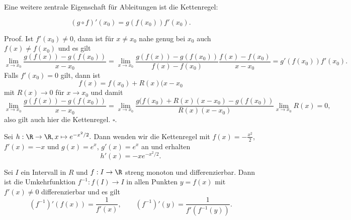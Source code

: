 \documentclass[letterpaper,10pt,english]{jupyterBook}
\begin{document}
Eine weitere zentrale Eigenschaft für Ableitungen ist die Kettenregel:
\label{differential/kombfkt:theorem-3}
\begin{theorem}{}{}


\begin{equation*}
 (g\circ f)'(x_0) = g(f(x_0)) f'(x_0).
\end{equation*}\end{theorem}

\begin{emphBox}{}{}
Proof. Ist \(f'(x_0) \neq 0\), dann ist für \(x\neq x_0\) nahe genug bei \(x_0\) auch \(f(x) \neq f(x_0)\) und es gilt
\begin{equation*}
\lim_{x \rightarrow x_0} \frac{g(f(x))-g(f(x_0))}{x-x_0} = \lim_{x \rightarrow x_0} \frac{g(f(x))-g(f(x_0))}{f(x)-f(x_0)}
 \frac{f(x)-f(x_0)}{x-x_0} = g'(f(x_0)) f'(x_0).
\end{equation*}
Falls \(f'(x_0)=0\) gilt, dann ist
\begin{equation*}
f(x) = f(x_0) +  R(x)(x-x_0
\end{equation*}
mit \(R(x) \rightarrow  0\) für \(x \rightarrow x_0\) und damit
\begin{equation*}
\lim_{x \rightarrow x_0} \frac{g(f(x))-g(f(x_0))}{x-x_0} =  
\lim_{x \rightarrow x_0} \frac{g(f(x_0)+R(x)(x-x_0)-g(f(x_0))}{R(x)(x-x_0)}  \lim_{x \rightarrow x_0} R(x) = 0,
\end{equation*}
also gilt auch hier die Kettenregel. \(\square\).
\end{emphBox}
\label{differential/kombfkt:example-4}
\begin{example}{}{}



Sei \(h: \R \rightarrow \R, x\mapsto e^{-x^2/2}.\) Dann wenden wir die Kettenregel mit \(f(x) = -\frac{x^2}2\), \(f'(x) = -x\) und
\(g(x) = e^x\), \(g'(x)=e^x\) an und erhalten
\begin{equation*}
h'(x) = - x e^{-x^2/2}.
\end{equation*}\end{example}
\label{differential/kombfkt:theorem-5}
\begin{theorem}{}{}



Sei \(I\) ein Intervall in \(R\) und \(f: I \rightarrow \R\) streng monoton und differenzierbar. Dann ist die Umkehrfunktion \(f^{-1}: f(I) \rightarrow I\) in allen Punkten \(y=f(x)\) mit \(f'(x) \neq 0\) differenzierbar und es gilt
\begin{equation*}
 (f^{-1})'(f(x)) = \frac{1}{f'(x)}, \qquad (f^{-1})'(y) = \frac{1}{f'(f^{-1}(y))}.
\end{equation*}\end{theorem}
\end{document}
